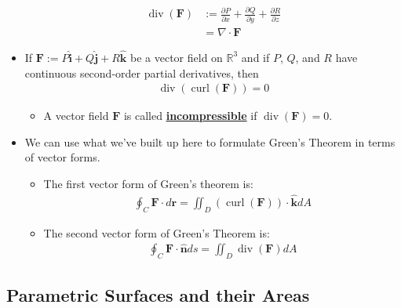 \documentclass[11pt]{article}
\newcommand{\dfn}[1]{\underline{\textbf{#1}}}
\newcommand{\R}[0]{\mathbb{R}}
\begin{document}
\begin{itemize}[noitemsep]
	\begin{align}
		\operatorname{div}(\mathbf{F}) & := \frac{\partial P}{\partial x} + \frac{\partial Q}{\partial y} + \frac{\partial R}{\partial z}	\\
			& = \nabla \cdot \mathbf{F} 
	\end{align}
	\item If $\mathbf{F} := P \hat{\mathbf{i}} + Q \hat{\mathbf{j}} + R \hat{\mathbf{k}}$ be a vector field on $\R^3$ and if $P$, $Q$, and $R$ have continuous second-order partial derivatives, then 
	\begin{align}
		\operatorname{div}( \operatorname{curl}(\mathbf{F})) = 0 	
	\end{align}
	\begin{itemize}[noitemsep]
		\item A vector field $\mathbf{F}$ is called \dfn{incompressible} if $\operatorname{div}(\mathbf{F}) =0$. 
	\end{itemize}
	\item We can use what we've built up here to formulate Green's Theorem in terms of vector forms. 
	\begin{itemize}[noitemsep]	
		\item The first vector form of Green's theorem is: 
		\begin{align}
			\oint_C \mathbf{F} \cdot d \mathbf{r} 	= \iint_D ( \operatorname{curl}(\mathbf{F})) \cdot \mathbf{\hat{k}} d A 
		\end{align}
		\item The second vector form of Green's Theorem is: 
		\begin{align}
			\oint_C \mathbf{F} \cdot \mathbf{\hat{n}}	ds = \iint_D \operatorname{div}(\mathbf{F}) dA
		\end{align}
	\end{itemize}
\end{itemize}

\subsection{Parametric Surfaces and their Areas}
\end{document}
